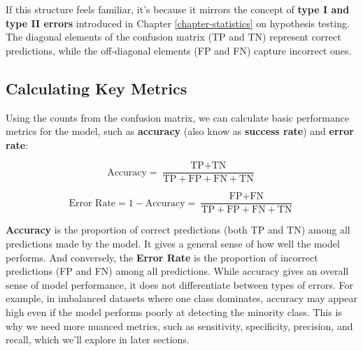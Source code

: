 \documentclass[
]{book}
\theoremstyle{definition}
\theoremstyle{definition}
\theoremstyle{definition}
\theoremstyle{definition}
\theoremstyle{remark}
\begin{document}
If this structure feels familiar, it's because it mirrors the concept of \textbf{type I and type II errors} introduced in Chapter \ref{chapter-statistics} on hypothesis testing. The diagonal elements of the confusion matrix (TP and TN) represent correct predictions, while the off-diagonal elements (FP and FN) capture incorrect ones.

\subsection*{Calculating Key Metrics}\label{calculating-key-metrics}

Using the counts from the confusion matrix, we can calculate basic performance metrics for the model, such as \textbf{accuracy} (also know as \textbf{success rate}) and \textbf{error rate}:

\[
\text{Accuracy} = \frac{\text{TP} + \text{TN}}{\text{TP} + \text{FP} + \text{FN} + \text{TN}}
\]

\[
\text{Error Rate} = 1 - \text{Accuracy} = \frac{\text{FP} + \text{FN}}{\text{TP} + \text{FP} + \text{FN} + \text{TN}}
\]

\textbf{Accuracy} is the proportion of correct predictions (both TP and TN) among all predictions made by the model. It gives a general sense of how well the model performs. And conversely, the \textbf{Error Rate} is the proportion of incorrect predictions (FP and FN) among all predictions. While accuracy gives an overall sense of model performance, it does not differentiate between types of errors. For example, in imbalanced datasets where one class dominates, accuracy may appear high even if the model performs poorly at detecting the minority class. This is why we need more nuanced metrics, such as sensitivity, specificity, precision, and recall, which we'll explore in later sections.
\end{document}
